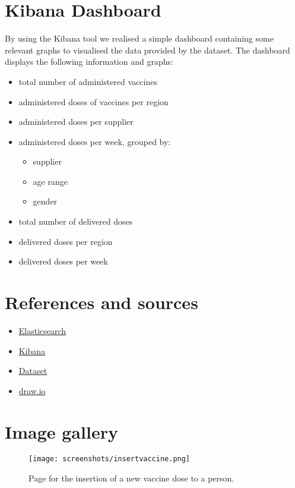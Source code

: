 \documentclass{article}
\begin{document}
\section{Kibana Dashboard}
By using the Kibana tool we realised a simple dashboard containing some relevant graphs to visualised the data provided by the dataset.
The dashboard displays the following information and graphs:
\begin{itemize}
    \item total number of administered vaccines
    \item administered doses of vaccines per region
    \item administered doses per supplier
    \item administered doses per week, grouped by:
    \begin{itemize}
        \item supplier
        \item age range
        \item gender
    \end{itemize}
    \item total number of delivered doses
    \item delivered doses per region
    \item delivered doses per week
\end{itemize}

    


\section{References and sources}
\begin{itemize}
    \item \href{https://www.elastic.co}{Elasticsearch}
    \item \href{https://www.elastic.co/kibana/}{Kibana}
    \item \href{https://github.com/italia/covid19-opendata-vaccini}{Dataset}
    \item \href{https://app.diagrams.net}{draw.io}
\end{itemize}


\section{Image gallery}


\begin{figure}[ht!]
    \centering
    \texttt{[image: screenshots/insertvaccine.png]}
    \caption{Page for the insertion of a new vaccine dose to a person.}
\end{figure}
\end{document}
